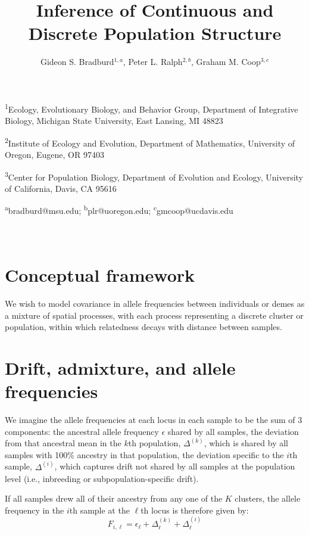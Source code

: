 \documentclass[12pt]{article}
\title{Inference of Continuous and Discrete Population Structure}
\date{\vspace{-5ex}}
\author{Gideon S. Bradburd$^{1,a}$, Peter L. Ralph$^{2,b}$, Graham M. Coop$^{3,c}$}
\begin{document}
\maketitle

\textsuperscript{1}Ecology, Evolutionary Biology, and Behavior Group, Department of Integrative Biology, Michigan State University, East Lansing, MI 48823

\textsuperscript{2}Institute of Ecology and Evolution, Department of Mathematics, University of Oregon, Eugene, OR 97403

\textsuperscript{3}Center for Population Biology, Department of Evolution and Ecology, University of California, Davis, CA 95616

\textsuperscript{a}bradburd@msu.edu; 
\textsuperscript{b}plr@uoregon.edu;
\textsuperscript{c}gmcoop@ucdavis.edu\\\\\

\newpage

\section{Conceptual framework} \label{big_idea}
We wish to model covariance in allele frequencies between individuals or demes as a mixture of spatial processes,
with each process representing a discrete cluster or population,
within which relatedness decays with distance between samples.

\section{Drift, admixture, and allele frequencies}
We imagine the allele frequencies at each locus in each sample to be the sum of 3 components: 
the ancestral allele frequency $\epsilon$ shared by all samples,
the deviation from that ancestral mean in the $k$th population, $\Delta^{(k)}$,
which is shared by all samples with 100\% ancestry in that population,
the deviation specific to the $i$th sample, $\Delta^{(i)}$,
which captures drift not shared by all samples at the population level
(i.e., inbreeding or subpopulation-specific drift).

If all samples drew all of their ancestry from any one of the $K$ clusters,
the  allele frequency in the $i$th sample at the $\ell$th locus is therefore given by:
\begin{equation}
F_{i,\ell} = \epsilon_{\ell} + \Delta^{(k)}_{\ell} + \Delta^{(i)}_{\ell}
\label{drift_terms_no_admix}
\end{equation}
\end{document}
